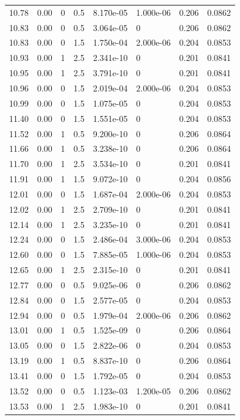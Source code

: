 \documentclass[preview]{standalone}
\begin{document}
{{{\begin{tabular}{L{1.2cm}C{1.2cm} C{0.3cm}C{0.5cm} C{1.4cm}C{1.4cm} C{1.4cm}C{1.4cm}}
  10.78  &  0.00  & 0     & 0.5 &  8.170e-05  & 1.000e-06  & 0.206 &  0.0862   \\ 
  10.83  &  0.00  & 0     & 0.5 &  3.064e-05  & 0  & 0.206 &  0.0862   \\ 
  10.83  &  0.00  & 0     & 1.5 &  1.750e-04  & 2.000e-06  & 0.204 &  0.0853   \\ 
  10.93  &  0.00  & 1     & 2.5 &  2.341e-10  & 0  & 0.201 &  0.0841   \\ 
  10.95  &  0.00  & 1     & 2.5 &  3.791e-10  & 0  & 0.201 &  0.0841   \\ 
  10.96  &  0.00  & 0     & 1.5 &  2.019e-04  & 2.000e-06  & 0.204 &  0.0853   \\ 
  10.99  &  0.00  & 0     & 1.5 &  1.075e-05  & 0  & 0.204 &  0.0853   \\ 
  11.40  &  0.00  & 0     & 1.5 &  1.551e-05  & 0  & 0.204 &  0.0853   \\ 
  11.52  &  0.00  & 1     & 0.5 &  9.200e-10  & 0  & 0.206 &  0.0864   \\ 
  11.66  &  0.00  & 1     & 0.5 &  3.238e-10  & 0  & 0.206 &  0.0864   \\ 
  11.70  &  0.00  & 1     & 2.5 &  3.534e-10  & 0  & 0.201 &  0.0841   \\ 
  11.91  &  0.00  & 1     & 1.5 &  9.072e-10  & 0  & 0.204 &  0.0856   \\ 
  12.01  &  0.00  & 0     & 1.5 &  1.687e-04  & 2.000e-06  & 0.204 &  0.0853   \\ 
  12.02  &  0.00  & 1     & 2.5 &  2.709e-10  & 0  & 0.201 &  0.0841   \\ 
  12.14  &  0.00  & 1     & 2.5 &  3.235e-10  & 0  & 0.201 &  0.0841   \\ 
  12.24  &  0.00  & 0     & 1.5 &  2.486e-04  & 3.000e-06  & 0.204 &  0.0853   \\ 
  12.60  &  0.00  & 0     & 1.5 &  7.885e-05  & 1.000e-06  & 0.204 &  0.0853   \\ 
  12.65  &  0.00  & 1     & 2.5 &  2.315e-10  & 0  & 0.201 &  0.0841   \\ 
  12.77  &  0.00  & 0     & 0.5 &  9.025e-06  & 0  & 0.206 &  0.0862   \\ 
  12.84  &  0.00  & 0     & 1.5 &  2.577e-05  & 0  & 0.204 &  0.0853   \\ 
  12.94  &  0.00  & 0     & 0.5 &  1.979e-04  & 2.000e-06  & 0.206 &  0.0862   \\ 
  13.01  &  0.00  & 1     & 0.5 &  1.525e-09  & 0  & 0.206 &  0.0864   \\ 
  13.05  &  0.00  & 0     & 1.5 &  2.822e-06  & 0  & 0.204 &  0.0853   \\ 
  13.19  &  0.00  & 1     & 0.5 &  8.837e-10  & 0  & 0.206 &  0.0864   \\ 
  13.41  &  0.00  & 0     & 1.5 &  1.792e-05  & 0  & 0.204 &  0.0853   \\ 
  13.52  &  0.00  & 0     & 0.5 &  1.123e-03  & 1.200e-05  & 0.206 &  0.0862   \\ 
  13.53  &  0.00  & 1     & 2.5 &  1.983e-10  & 0  & 0.201 &  0.0841   \\ 
\hline 
\end{tabular} 

}}}
\end{document}

